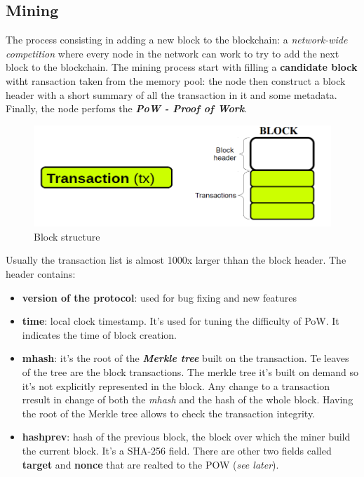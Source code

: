 \documentclass[10pt,a4paper]{report}
\begin{document}
\subsection{Mining}\label{sec:mining}
The process consisting in adding a new block to the blockchain: a \textit{network-wide competition} where every node in the network can work to try to add the next block to the blockchain. The mining process start with filling a \textbf{candidate block} witht ransaction taken from the memory pool: the node then construct a block header with a short summary of all the transaction in it and some metadata. Finally, the node perfoms the \textit{\textbf{PoW - Proof of Work}}.
\begin{figure}[h]
	\centering
	\includegraphics[scale=0.40]{images/Pasted image 20230331150840.png}
	\caption{Block structure}\end{figure}

Usually the transaction list is almost 1000x larger thhan the block header. The header contains:
\begin{itemize}
	\item 
	\textbf{version of the protocol}: used for bug fixing and new features
	\item 
	\textbf{time}: local clock timestamp. It's used for tuning the difficulty of PoW. It indicates the time of block creation.
	\item 
	\textbf{mhash}: it's the root of the \textit{\textbf{Merkle tree}} built on the transaction. Te leaves of the tree are the block transactions. The merkle tree it's built on demand so it's not explicitly represented in the block. Any change to a transaction rresult in change of both the \textit{mhash} and the hash of the whole block. Having the root of the Merkle tree allows to check the transaction integrity.
	\item 
	\textbf{hashprev}: hash of the previous block, the block over which the miner build the current block. It's a SHA-256 field.
	There are other two fields  called \textbf{target} and \textbf{nonce} that are realted to the POW (\textit{see later}).
\end{itemize}
\end{document}
